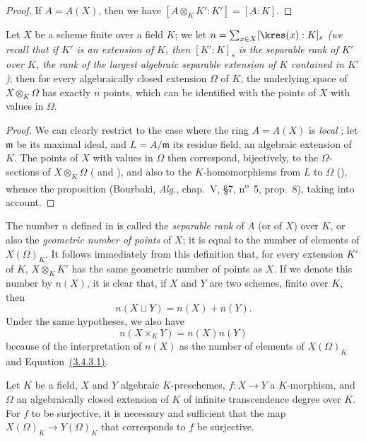 \begin{proof}
If $A=A(X)$, then we have $[A\otimes_K K':K']=[A:K]$.
\end{proof}

\begin{corollary}[6.4.7]
\label{I.6.4.7}
Let $X$ be a scheme finite over a field $K$;
we let $n=\sum_{x\in X}[\kres(x):K]_s$ \emph{(we recall that if $K'$ is an extension of $K$, then $[K':K]_s$ is the \emph{separable rank} of $K'$ over $K$, the rank of the largest algebraic separable extension of $K$ contained in $K'$)};
then
for every algebraically closed extension $\Omega$ of $K$, the underlying space of $X\otimes_K\Omega$ has exactly $n$ points, which can be identified with the points of $X$ with values in $\Omega$.
\end{corollary}

\begin{proof}
We can clearly restrict to the case where the ring $A=A(X)$ is \emph{local} ;
let $\mathfrak{m}$ be its maximal ideal, and $L=A/\mathfrak{m}$ its residue field, an algebraic extension of $K$.
The points of $X$ with values in $\Omega$ then correspond, bijectively, to the $\Omega$-sections of $X\otimes_K\Omega$ ( and ), and also to the $K$-homomorphisms from $L$ to $\Omega$ (), whence the proposition (Bourbaki, \emph{Alg.}, chap.~V, §7, n\textsuperscript{o}~5, prop.~8), taking  into account.
\end{proof}

\begin{env}[6.4.8]
\label{I.6.4.8}
The number $n$ defined in  is called the \emph{separable rank} of $A$ (or of $X$) over $K$, or also the \emph{geometric number of points} of $X$;
it is equal to the number of elements of $X(\Omega)_K$.
It follows immediately from this definition that, for every extension $K'$ of $K$, $X\otimes_K K'$ has the same geometric number of points as $X$.
If we denote this number by $n(X)$, it is clear that, if $X$ and $Y$ are two schemes, finite over $K$, then
\[
  n(X\sqcup Y)=n(X)+n(Y).
  \tag{6.4.8.1}
\]
Under the same hypotheses, we also have
\[
  n(X\times_K Y)=n(X)n(Y)
  \tag{6.4.8.2}
\]
because of the interpretation of $n(X)$ as the number of elements of $X(\Omega)_K$ and Equation~\hyperref[I.3.4.3.1]{(3.4.3.1)}.
\end{env}

\begin{proposition}[6.4.9]
\label{I.6.4.9}
Let $K$ be a field, $X$ and $Y$ algebraic $K$-preschemes, $f:X\to Y$ a $K$-morphism, and $\Omega$ an algebraically closed extension of $K$ of infinite transcendence degree over $K$.
For $f$ to be surjective, it is necessary and sufficient that the map $X(\Omega)_K\to Y(\Omega)_K$ that corresponds to $f$  be surjective.
\end{proposition}

